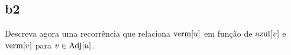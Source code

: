\subsection{b2} Descreva agora uma recorrência que relaciona $\mathrm{verm}[u]$ em função de $\mathrm{azul}[v]$ e $\mathrm{verm}[v]$ para $v \in \operatorname{Adj}[u]$.

\itemdsep[0.25]

